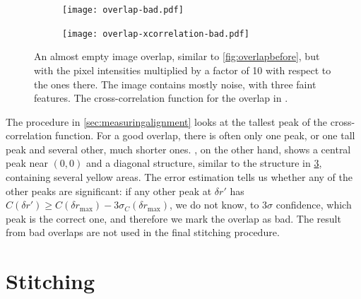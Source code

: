 \documentclass{article}
\begin{document}
\begin{figure}[ht]
	\centering
	\begin{subfigure}{0.45\linewidth}
		\texttt{[image: overlap-bad.pdf]}
		\caption{}
		\label{fig:badimage}
	\end{subfigure}
	\begin{subfigure}{0.45\linewidth}
		\texttt{[image: overlap-xcorrelation-bad.pdf]}
		\caption{}
		\label{fig:badxcorrelation}
	\end{subfigure}
	\caption{ An almost empty image overlap, similar to \cref{fig:overlapbefore}, but with the pixel intensities multiplied by a factor of 10 with respect to the ones there.  The image contains mostly noise, with three faint features.   The cross-correlation function for the overlap in .}
	\label{fig:badoverlap}
\end{figure}

The procedure in \cref{sec:measuringalignment} looks at the tallest peak of the cross-correlation function.  For a good overlap, there is often only one peak, or one tall peak and several other, much shorter ones.  , on the other hand, shows a central peak near $(0, 0)$ and a diagonal structure, similar to the structure in \cref{fig:badoverlap}, containing several yellow areas.  The error estimation tells us whether any of the other peaks are significant: if any other peak at $\delta r'$ has $C(\delta r')\ge C(\delta r_\text{max})-3\sigma_C(\delta r_\text{max})$, we do not know, to $3\sigma$ confidence, which peak is the correct one, and therefore we mark the overlap as bad.  The result from bad overlaps are not used in the final stitching procedure.

\section{Stitching}
\label{sec:stitching}
\end{document}
